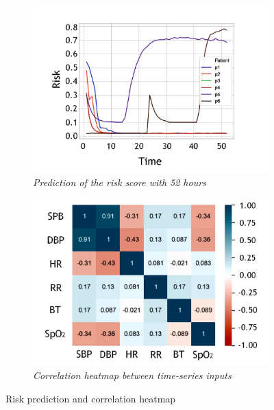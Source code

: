 \begin{figure}[hbt!]
    \centering
    \begin{subfigure}{0.45\linewidth}
        \centering
        \includegraphics[width=\linewidth]{images/riskPrediction.pdf}
        \caption{\textit{Prediction of the risk score with 52 hours}}
        \label{fig:figure7}
    \end{subfigure}
    \hfill
    \begin{subfigure}{0.45\linewidth}
        \centering
        \includegraphics[width=\linewidth]{images/correlations.pdf}
        \caption{\textit{Correlation heatmap between time-series inputs}}
        \label{fig:figure8}
    \end{subfigure}
    \caption{Risk prediction and correlation heatmap}
    \label{fig:figure7_8}
\end{figure}
